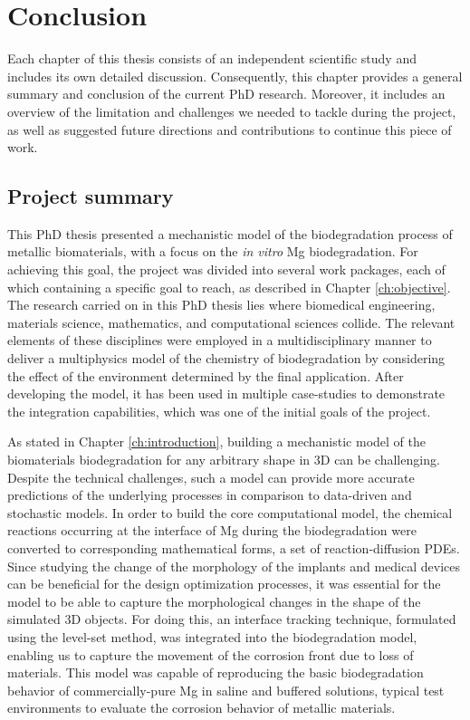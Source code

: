 \chapter{Conclusion}\label{ch:conclusion}


Each chapter of this thesis consists of an independent scientific study and includes its own detailed discussion. Consequently, this chapter provides a general summary and conclusion of the current PhD research. Moreover, it includes an overview of the limitation and challenges we needed to tackle during the project, as well as suggested future directions and contributions to continue this piece of work.

\section{Project summary}


This PhD thesis presented a mechanistic model of the biodegradation process of metallic biomaterials, with a focus on the \textit{in vitro} Mg biodegradation. For achieving this goal, the project was divided into several work packages, each of which containing a specific goal to reach, as described in Chapter \ref{ch:objective}. The research carried on in this PhD thesis lies where biomedical engineering, materials science, mathematics, and computational sciences collide. The relevant elements of these disciplines were employed in a multidisciplinary manner to deliver a multiphysics model of the chemistry of biodegradation by considering the effect of the environment determined by the final application. After developing the model, it has been used in multiple case-studies to demonstrate the integration capabilities, which was one of the initial goals of the project.

As stated in Chapter \ref{ch:introduction}, building a mechanistic model of the biomaterials biodegradation for any arbitrary shape in 3D can be challenging. Despite the technical challenges, such a model can provide more accurate predictions of the underlying processes in comparison to data-driven and stochastic models. In order to build the core computational model, the chemical reactions occurring at the interface of Mg during the biodegradation were converted to corresponding mathematical forms, a set of reaction-diffusion PDEs. Since studying the change of the morphology of the implants and medical devices can be beneficial for the design optimization processes, it was essential for the model to be able to capture the morphological changes in the shape of the simulated 3D objects. For doing this, an interface tracking technique, formulated using the level-set method, was integrated into the biodegradation model, enabling us to capture the movement of the corrosion front due to loss of materials. This model was capable of reproducing the basic biodegradation behavior of commercially-pure Mg in saline and buffered solutions, typical test environments to evaluate the corrosion behavior of metallic materials. 

